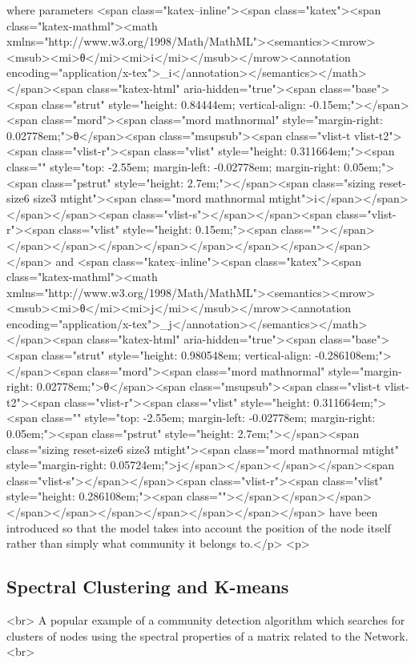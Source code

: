 where parameters <span class="katex--inline"><span class="katex"><span class="katex-mathml"><math xmlns="http://www.w3.org/1998/Math/MathML"><semantics><mrow><msub><mi>θ</mi><mi>i</mi></msub></mrow><annotation encoding="application/x-tex">\theta_i</annotation></semantics></math></span><span class="katex-html" aria-hidden="true"><span class="base"><span class="strut" style="height: 0.84444em; vertical-align: -0.15em;"></span><span class="mord"><span class="mord mathnormal" style="margin-right: 0.02778em;">θ</span><span class="msupsub"><span class="vlist-t vlist-t2"><span class="vlist-r"><span class="vlist" style="height: 0.311664em;"><span class="" style="top: -2.55em; margin-left: -0.02778em; margin-right: 0.05em;"><span class="pstrut" style="height: 2.7em;"></span><span class="sizing reset-size6 size3 mtight"><span class="mord mathnormal mtight">i</span></span></span></span><span class="vlist-s">​</span></span><span class="vlist-r"><span class="vlist" style="height: 0.15em;"><span class=""></span></span></span></span></span></span></span></span></span></span> and <span class="katex--inline"><span class="katex"><span class="katex-mathml"><math xmlns="http://www.w3.org/1998/Math/MathML"><semantics><mrow><msub><mi>θ</mi><mi>j</mi></msub></mrow><annotation encoding="application/x-tex">\theta_j</annotation></semantics></math></span><span class="katex-html" aria-hidden="true"><span class="base"><span class="strut" style="height: 0.980548em; vertical-align: -0.286108em;"></span><span class="mord"><span class="mord mathnormal" style="margin-right: 0.02778em;">θ</span><span class="msupsub"><span class="vlist-t vlist-t2"><span class="vlist-r"><span class="vlist" style="height: 0.311664em;"><span class="" style="top: -2.55em; margin-left: -0.02778em; margin-right: 0.05em;"><span class="pstrut" style="height: 2.7em;"></span><span class="sizing reset-size6 size3 mtight"><span class="mord mathnormal mtight" style="margin-right: 0.05724em;">j</span></span></span></span><span class="vlist-s">​</span></span><span class="vlist-r"><span class="vlist" style="height: 0.286108em;"><span class=""></span></span></span></span></span></span></span></span></span></span> have been introduced so that the model takes into account the position of the node itself rather than simply what community it belongs to.</p>
<p>\subsection{Spectral Clustering and K-means}<br>
A popular example of a community detection algorithm which searches for clusters of nodes using the spectral properties of a matrix related to the Network.<br>
